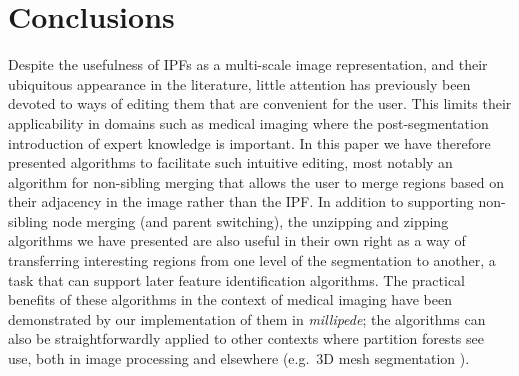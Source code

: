 \documentclass[10pt,twocolumn,twoside]{IEEEtran}
\begin{document}
\section{Conclusions}
\label{sec:conclusions}

Despite the usefulness of IPFs as a multi-scale image representation, and their ubiquitous appearance in the literature, little attention has previously been devoted to ways of editing them that are convenient for the user. This limits their applicability in domains such as medical imaging where the post-segmentation introduction of expert knowledge is important. In this paper we have therefore presented algorithms to facilitate such intuitive editing, most notably an algorithm for non-sibling merging that allows the user to merge regions based on their adjacency in the image rather than the IPF. In addition to supporting non-sibling node merging (and parent switching), the unzipping and zipping algorithms we have presented are also useful in their own right as a way of transferring interesting regions from one level of the segmentation to another, a task that can support later feature identification algorithms. The practical benefits of these algorithms in the context of medical imaging have been demonstrated by our implementation of them in \emph{millipede}; the algorithms can also be straightforwardly applied to other contexts where partition forests see use, both in image processing and elsewhere (e.g.~3D mesh segmentation \cite{garland01}).
\end{document}
